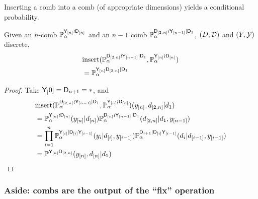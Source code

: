 Inserting a comb into a comb (of appropriate dimensions) yields a conditional probability.

\begin{theorem}
Given an $n$-comb $\mathbb{P}_\alpha^{\mathsf{Y}_{[n]}\wr \mathsf{D}_{[n]}}$ and an $n-1$ comb $\mathbb{P}_\alpha^{\mathsf{D}_{[2,n]}\wr \mathsf{Y}_{[n-1]}|\mathsf{D}_1}$, $(D,\mathcal{D})$ and $(Y,\mathcal{Y})$ discrete,
\begin{align}
    &\mathrm{insert}(\mathbb{P}_\alpha^{\mathsf{D}_{[2,n]}\wr \mathsf{Y}_{[n-1]}|\mathsf{D}_1},\mathbb{P}_\alpha^{\mathsf{Y}_{[n]}\wr \mathsf{D}_{[n]}})\\
     &= \mathbb{P}_\alpha^{\mathsf{Y}_{[n]}\mathsf{D}_{[2,n]}|\mathsf{D}_1}
\end{align}
\end{theorem}

\begin{proof}
Take $\mathsf{Y}_[0]=\mathsf{D}_{n+1}=*$, and
\begin{align}
    &\mathrm{insert}(\mathbb{P}_\alpha^{\mathsf{D}_{[2,n]}\wr \mathsf{Y}_{[n-1]}|\mathsf{D}_1},\mathbb{P}_\alpha^{\mathsf{Y}_{[n]}\wr \mathsf{D}_{[n]}})(y_{[n]},d_{[2,n]}|d_1)\\
     &= \mathbb{P}_\alpha^{\mathsf{Y}_{[n]}\wr \mathsf{D}_{[n]}}(y_{[n]}|d_{[n]})\mathbb{P}_\alpha^{\mathsf{D}_{[n]}\wr\mathsf{Y}_{[n-1]}|\mathsf{D}_1}(d_{[2,n]}|d_1,y_{[n-1]})\\
    &= \prod_{i=1}^n \mathbb{P}_\alpha^{\mathsf{Y}_{[i]}|\mathsf{D}_{[i]}\mathsf{Y}_{[i-1]}}(y_i|d_{[i]},y_{[i-1]})\mathbb{P}_\alpha^{\mathsf{D}_{i+1}|\mathsf{D}_{[i]}\mathsf{Y}_{[i-1]}}(d_i|d_{[i-1]},y_{[i-1]})\\
    &= \mathbb{P}^{\mathsf{Y}_{[n]}\mathsf{D}_{[2,n]}}(y_{[n]},d_{[n]}|d_1)
\end{align}
    
\end{proof}

\subsubsection{Aside: combs are the output of the ``fix'' operation}


